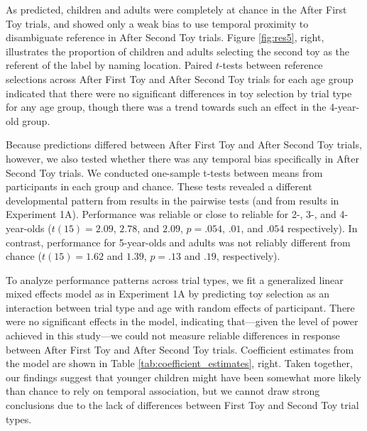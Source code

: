 \documentclass[man]{apa2}
\begin{document}
As predicted, children and adults were completely at chance in the After First Toy trials, and showed only a weak bias to use temporal proximity to disambiguate reference in After Second Toy trials. Figure \ref{fig:res5}, right, illustrates the proportion of children and adults selecting the second toy as the referent of the label by naming location.  Paired $t$-tests between reference selections across After First Toy and After Second Toy trials for each age group indicated that there were no significant differences in toy selection by trial type for any age group, though there was a trend towards such an effect in the 4-year-old group. 






Because predictions differed between After First Toy and After Second Toy trials, however, we also tested whether there was any temporal bias specifically in After Second Toy trials. We conducted one-sample t-tests between means from participants in each group and chance. These tests revealed a different developmental pattern from results in the pairwise tests (and from results in Experiment 1A). Performance was reliable or close to reliable for 2-, 3-, and 4-year-olds ($t(15) = 2.09$, $2.78$, and $2.09$, $p = .054$, $.01$, and $.054$ respectively). In contrast, performance for 5-year-olds and adults was not reliably different from chance ($t(15) = 1.62$ and $1.39$, $p = .13$ and $.19$, respectively). 

To analyze performance patterns across trial types, we fit a generalized linear mixed effects model as in Experiment 1A by predicting toy selection as an interaction between trial type and age with random effects of participant.  There were no significant effects in the model, indicating that---given the level of power achieved in this study---we could not measure reliable differences in response between After First Toy and After Second Toy trials. Coefficient estimates from the model are shown in Table \ref{tab:coefficient_estimates}, right. Taken together, our findings suggest that younger children might have been somewhat more likely than chance to rely on temporal association, but we cannot draw strong conclusions due to the lack of differences between First Toy and Second Toy trial types. 
\end{document}
